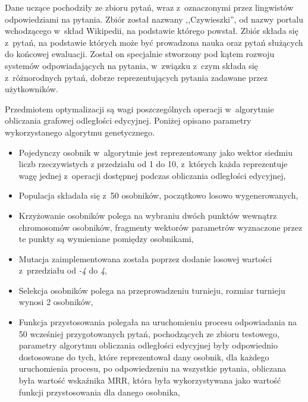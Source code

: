 \documentclass[a4paper, twoside, openright, 12pt]{report}
\begin{document}
        Dane uczące pochodziły ze zbioru pytań, wraz z~oznaczonymi przez lingwistów odpowiedziami na pytania. Zbiór został
        nazwany ,,Czywieszki'', od nazwy portalu wchodzącego w~skład Wikipedii, na podstawie którego powstał\cite{CZYWIESZKI}.
        Zbiór składa się z~pytań, na podstawie których może być prowadzona nauka oraz pytań służących do końcowej ewaluacji.
        Został on specjalnie stworzony pod kątem rozwoju systemów odpowiadających na pytania, w~związku z~czym składa się
        z~różnorodnych pytań, dobrze reprezentujących pytania zadawane przez użytkowników.

        Przedmiotem optymalizacji są wagi poszczególnych operacji w~algorytmie obliczania grafowej odległości edycyjnej.
        Poniżej opisano parametry wykorzystanego algorytmu genetycznego.
        \begin{itemize}
            \item Pojedynczy osobnik w~algorytmie jest reprezentowany jako wektor siedmiu liczb rzeczywistych z
                przedziału od 1 do 10, z~których każda reprezentuje wagę jednej z~operacji dostępnej podczas obliczania
                odległości edycyjnej,
            \item Populacja składała się z~50 osobników, początkowo losowo wygenerowanych,
            \item Krzyżowanie osobników polega na wybraniu dwóch punktów wewnątrz chromosomów osobników, fragmenty
                wektorów parametrów wyznaczone przez te punkty są wymieniane pomiędzy osobnikami,
            \item Mutacja zaimplementowana została poprzez dodanie losowej wartości z~przedziału od \emph{-4} do \emph{4},
            \item Selekcja osobników polega na przeprowadzeniu turnieju, rozmiar turnieju wynosi 2 osobników,
            \item Funkcja przystosowania polegała na uruchomieniu procesu odpowiadania na 50 wcześniej przygotowanych
                pytań, pochodzących
                ze zbioru testowego, parametry algorytmu obliczania odległości edycyjnej były odpowiednio dostosowane do
                tych, które reprezentował dany osobnik, dla każdego uruchomienia procesu, po odpowiedzeniu na wszystkie
                pytania, obliczana była wartość wskaźnika MRR, która była wykorzystywana jako wartość funkcji przystosowania dla
                danego osobnika,
        \end{itemize}
\end{document}
